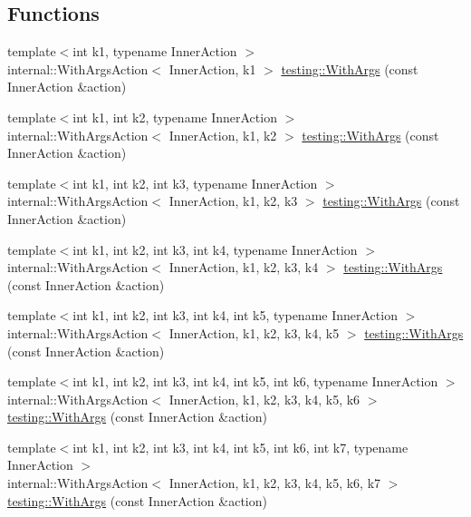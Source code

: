 \subsection*{Functions}
\begin{DoxyCompactItemize}
\item 
{\footnotesize template$<$int k1, typename Inner\+Action $>$ }\\internal\+::\+With\+Args\+Action$<$ Inner\+Action, k1 $>$ \mbox{\hyperlink{namespacetesting_a3bd9eef13bee9065b19d3cd571829c7c}{testing\+::\+With\+Args}} (const Inner\+Action \&action)
\item 
{\footnotesize template$<$int k1, int k2, typename Inner\+Action $>$ }\\internal\+::\+With\+Args\+Action$<$ Inner\+Action, k1, k2 $>$ \mbox{\hyperlink{namespacetesting_aa82fc09250ba172220e6fb7e77249e74}{testing\+::\+With\+Args}} (const Inner\+Action \&action)
\item 
{\footnotesize template$<$int k1, int k2, int k3, typename Inner\+Action $>$ }\\internal\+::\+With\+Args\+Action$<$ Inner\+Action, k1, k2, k3 $>$ \mbox{\hyperlink{namespacetesting_a999614cb785165b9a44a9a95a3753407}{testing\+::\+With\+Args}} (const Inner\+Action \&action)
\item 
{\footnotesize template$<$int k1, int k2, int k3, int k4, typename Inner\+Action $>$ }\\internal\+::\+With\+Args\+Action$<$ Inner\+Action, k1, k2, k3, k4 $>$ \mbox{\hyperlink{namespacetesting_a646a2e4ac7866ee8c486cb167ba9b45e}{testing\+::\+With\+Args}} (const Inner\+Action \&action)
\item 
{\footnotesize template$<$int k1, int k2, int k3, int k4, int k5, typename Inner\+Action $>$ }\\internal\+::\+With\+Args\+Action$<$ Inner\+Action, k1, k2, k3, k4, k5 $>$ \mbox{\hyperlink{namespacetesting_aa36b0c7216df96bdacf9fe491afd40bd}{testing\+::\+With\+Args}} (const Inner\+Action \&action)
\item 
{\footnotesize template$<$int k1, int k2, int k3, int k4, int k5, int k6, typename Inner\+Action $>$ }\\internal\+::\+With\+Args\+Action$<$ Inner\+Action, k1, k2, k3, k4, k5, k6 $>$ \mbox{\hyperlink{namespacetesting_a6df9cd27659e5943b5d3d77fc4f102e3}{testing\+::\+With\+Args}} (const Inner\+Action \&action)
\item 
{\footnotesize template$<$int k1, int k2, int k3, int k4, int k5, int k6, int k7, typename Inner\+Action $>$ }\\internal\+::\+With\+Args\+Action$<$ Inner\+Action, k1, k2, k3, k4, k5, k6, k7 $>$ \mbox{\hyperlink{namespacetesting_a04146a27847141c6942e9c67a85aadbe}{testing\+::\+With\+Args}} (const Inner\+Action \&action)

\end{DoxyCompactItemize}
